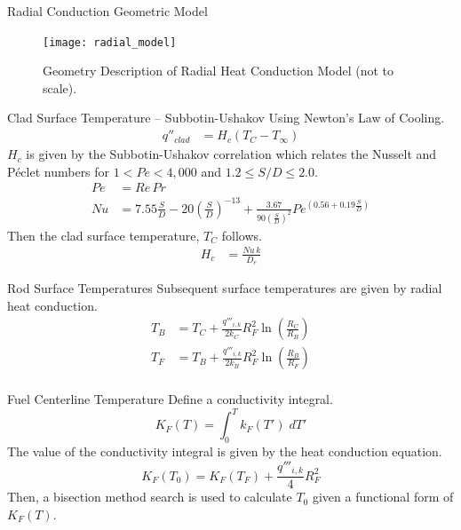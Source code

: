 \begin{frame}{Radial Conduction Geometric Model}
  \begin{figure}
    \centering
    \texttt{[image: radial\_model]}
    \caption{Geometry Description of Radial Heat Conduction Model (not to
      scale).}
    \label{fig:radial_model}
  \end{figure}
\end{frame}

\begin{frame}{Clad Surface Temperature -- Subbotin-Ushakov}
  Using Newton's Law of Cooling.
  \begin{align}
    q''_{clad} &= H_c (T_C - T_{\infty}) %
  \end{align}
  $H_c$ is given by the Subbotin-Ushakov correlation \cite{subbotinUshakov}
  which relates the Nusselt and P\'eclet numbers for ${1 < Pe < 4,000}$ and 
  ${ 1.2 \le S/D \le 2.0 }$.
  \begin{align}
    Pe &= Re \, Pr \\
    \label{eq:subbotinUshakov}
    Nu &= 7.55 \frac{S}{D} - 20 \left(\frac{S}{D}\right)^{-13} + 
      \frac{3.67}{90\left(\frac{S}{D}\right)^{2}}
      Pe^{\left(0.56 + 0.19 \frac{S}{D}\right)}
  \end{align}
  Then the clad surface temperature, $T_C$ follows.
  \begin{align}
    H_c &= \frac{N\!u \, k}{D_e} %
  \end{align}
\end{frame}

\begin{frame}{Rod Surface Temperatures}
  Subsequent surface temperatures are given by radial heat conduction.
  \begin{align}
    \label{eq:tb_forward}
    T_B &= T_C + \frac{q'''_{i,k}}{2 k_C} R_F^2
      \ln\left(\frac{R_C}{R_B}\right) \\
    \label{eq:tf_forward}
    T_F &= T_B + \frac{q'''_{i,k}}{2 k_B} R_F^2 
      \ln\left(\frac{R_B}{R_F}\right) \\
  \end{align}
\end{frame}

\begin{frame}{Fuel Centerline Temperature}
  Define a conductivity integral.
  \begin{equation}
    \label{eq:conductivity_integral}
    K_F(T) = \int_0^T k_F(T') \; dT'
  \end{equation}
  The value of the conductivity integral is given by the heat conduction
  equation.
  \begin{equation}
    \label{eq:tcl_conductivity_integral}
    K_F(T_0) = K_F(T_F) + \frac{q'''_{i,k}}{4} R_F^2
  \end{equation}
  Then, a bisection method search is used to calculate $T_0$ given a functional
  form of $K_F(T)$.
\end{frame}

